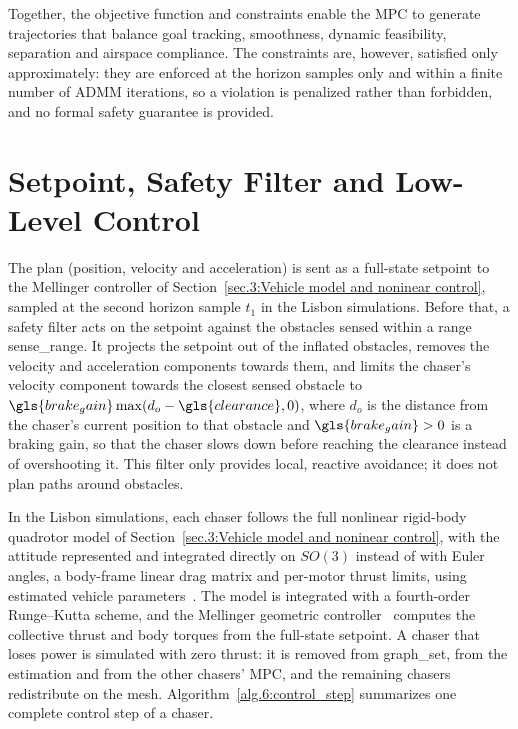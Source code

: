 Together, the objective function and constraints enable the \gls{MPC} to generate trajectories that balance goal tracking, smoothness, dynamic feasibility, separation and airspace compliance. The constraints are, however, satisfied only approximately: they are enforced at the horizon samples only and within a finite number of \gls{ADMM} iterations, so a violation is penalized rather than forbidden, and no formal safety guarantee is provided.

\section{Setpoint, Safety Filter and Low-Level Control} \label{sec.6:low_level}

The plan (position, velocity and acceleration) is sent as a full-state setpoint to the Mellinger controller of Section~\ref{sec.3:Vehicle model and noninear control}, sampled at the second horizon sample $t_1$ in the Lisbon simulations. Before that, a safety filter acts on the setpoint against the obstacles sensed within a range \gls{sense_range}. It projects the setpoint out of the inflated obstacles, removes the velocity and acceleration components towards them, and limits the chaser's velocity component towards the closest sensed obstacle to $\gls{brake_gain}\max(d_o-\gls{clearance},0)$, where $d_o$ is the distance from the chaser's current position to that obstacle and $\gls{brake_gain}>0$ is a braking gain, so that the chaser slows down before reaching the clearance instead of overshooting it. This filter only provides local, reactive avoidance; it does not plan paths around obstacles.

In the Lisbon simulations, each chaser follows the full nonlinear rigid-body quadrotor model of Section~\ref{sec.3:Vehicle model and noninear control}, with the attitude represented and integrated directly on $SO(3)$ instead of with Euler angles, a body-frame linear drag matrix and per-motor thrust limits, using estimated vehicle parameters~\cite{crazyflow}. The model is integrated with a fourth-order Runge--Kutta scheme, and the Mellinger geometric controller~\cite{mellingerMinimumSnapTrajectory2011} computes the collective thrust and body torques from the full-state setpoint. A chaser that loses power is simulated with zero thrust: it is removed from \gls{graph_set}, from the estimation and from the other chasers' \gls{MPC}, and the remaining chasers redistribute on the mesh. Algorithm~\ref{alg.6:control_step} summarizes one complete control step of a chaser.

